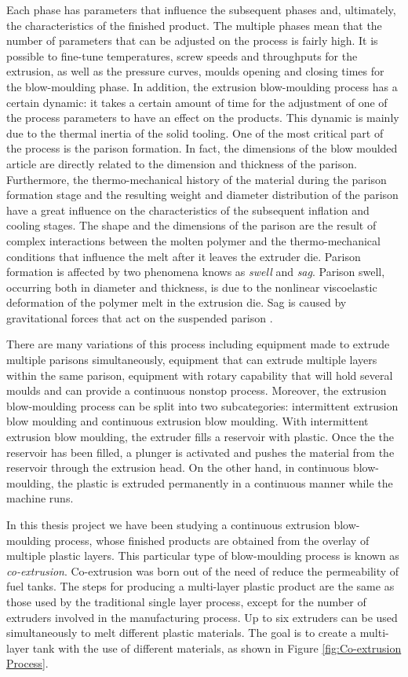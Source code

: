 Each phase has parameters that inﬂuence the subsequent phases and, ultimately, the characteristics of the ﬁnished product. The multiple phases mean that the number of parameters that can be adjusted on the process is fairly high. It is possible to fine-tune temperatures, screw speeds and throughputs for the extrusion, as well as the  pressure curves, moulds opening and closing times for the blow-moulding phase. In addition, the extrusion blow-moulding process has a certain dynamic: it takes a certain amount of time for the adjustment of one of the process parameters to have an effect on the products. This dynamic is mainly due to the thermal inertia of the solid tooling.
One of the most critical part of the process is the parison formation. In fact, the dimensions of the blow moulded article are directly related to the dimension and thickness of the parison. Furthermore, the thermo-mechanical history of the material during the parison formation stage and the resulting weight and diameter distribution of the parison have a great influence on the characteristics of the subsequent inflation and cooling stages. The shape and the dimensions of the parison are the result of complex interactions between the molten polymer and the thermo-mechanical conditions that influence the melt after it leaves the extruder die. Parison formation is affected by two phenomena knows as \textit{swell} and \textit{sag}. Parison swell, occurring both in diameter and thickness, is due to the nonlinear viscoelastic deformation of the polymer melt in the extrusion die. Sag is caused by gravitational forces that act on the suspended parison \citep{huang2002prediction}.

There are many variations of this process including equipment made to extrude multiple parisons simultaneously, equipment that can extrude multiple layers within the same parison, equipment with rotary capability that will hold several moulds and can provide a continuous nonstop process. Moreover, the extrusion blow-moulding process can be split into two subcategories: intermittent extrusion blow moulding and continuous extrusion blow moulding. With intermittent extrusion blow moulding, the extruder fills a reservoir with plastic. Once the the reservoir has been filled, a plunger is activated and pushes the material from the reservoir through the extrusion head. On the other hand, in continuous blow-moulding, the plastic is extruded permanently in a continuous manner while the machine runs.

In this thesis project we have been studying a continuous extrusion blow-moulding process, whose finished products are obtained from the overlay of multiple plastic layers. This particular type of blow-moulding process is known as \textit{co-extrusion}. Co-extrusion was born out of the need of reduce the permeability of fuel tanks. The steps for producing a multi-layer plastic product are the same as those used by the traditional single layer process, except for the number of extruders involved in the manufacturing process. Up to six extruders can be used simultaneously to melt different plastic materials. The goal is to create a multi-layer tank with the use of different materials, as shown in Figure \ref{fig:Co-extrusion Process}.

